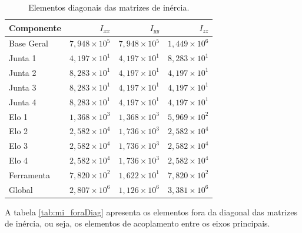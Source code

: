 \begin{table}[H]
\centering
\caption{Elementos diagonais das matrizes de inércia.}
\label{tab:mi_diag}
\begin{tabular}{lrrr}
\toprule
Componente & $I_{xx}$ & $I_{yy}$ & $I_{zz}$ \\
\midrule
Base Geral
& $7{,}948\times 10^{5}$
& $7{,}948\times 10^{5}$
& $1{,}449\times 10^{6}$ \\
Junta 1
& $4{,}197\times 10^{1}$
& $4{,}197\times 10^{1}$
& $8{,}283\times 10^{1}$ \\
Junta 2
& $8{,}283\times 10^{1}$
& $4{,}197\times 10^{1}$
& $4{,}197\times 10^{1}$ \\
Junta 3
& $8{,}283\times 10^{1}$
& $4{,}197\times 10^{1}$
& $4{,}197\times 10^{1}$ \\
Junta 4
& $8{,}283\times 10^{1}$
& $4{,}197\times 10^{1}$
& $4{,}197\times 10^{1}$ \\
Elo 1
& $1{,}368\times 10^{3}$
& $1{,}368\times 10^{3}$
& $5{,}969\times 10^{2}$ \\
Elo 2
& $2{,}582\times 10^{4}$
& $1{,}736\times 10^{3}$
& $2{,}582\times 10^{4}$ \\
Elo 3
& $2{,}582\times 10^{4}$
& $1{,}736\times 10^{3}$
& $2{,}582\times 10^{4}$ \\
Elo 4
& $2{,}582\times 10^{4}$
& $1{,}736\times 10^{3}$
& $2{,}582\times 10^{4}$ \\
Ferramenta
& $7{,}820\times 10^{2}$
& $1{,}622\times 10^{1}$
& $7{,}820\times 10^{2}$ \\
Global
& $2{,}807\times 10^{6}$
& $1{,}126\times 10^{6}$
& $3{,}381\times 10^{6}$ \\
\bottomrule
\end{tabular}
\end{table}

A tabela \eqref{tab:mi_foraDiag} apresenta os elementos fora da diagonal das matrizes de inércia, ou seja, os elementos de acoplamento entre os eixos principais.

